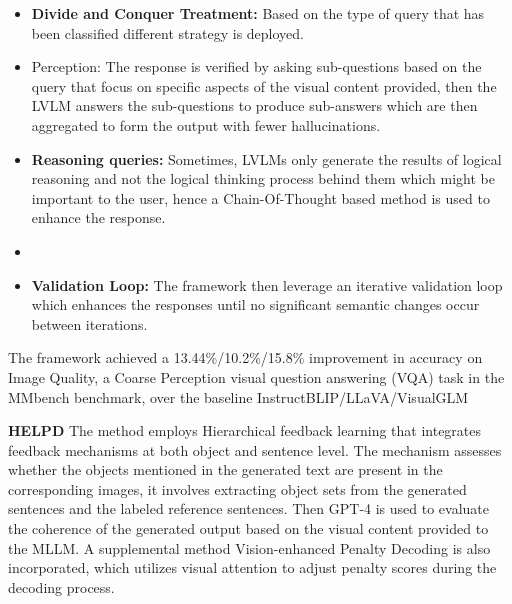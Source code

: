 \documentclass[twocolumn, 9pt]{extarticle}
\begin{document}
\begin{itemize}
    \item \textbf{Divide and Conquer Treatment:} Based on the type of query that has been classified different strategy is deployed.
    \item Perception: The response is verified by asking sub-questions based on the query that focus on specific aspects of the visual content provided, then the LVLM answers the sub-questions to produce sub-answers which are then aggregated to form the output with fewer hallucinations.
    \item \textbf{Reasoning queries:}  Sometimes, LVLMs only generate the results of logical reasoning and not the logical thinking process behind them which might be important to the user, hence a Chain-Of-Thought based method is used to enhance the response.
    \item 
    \item \textbf{Validation Loop:} The framework then leverage an iterative validation loop which enhances the responses until no significant semantic changes occur between iterations.
\end{itemize}

The framework achieved a 13.44\%/10.2\%/15.8\% improvement in accuracy on Image Quality, a Coarse Perception visual question answering (VQA) task in the MMbench benchmark, over the baseline InstructBLIP/LLaVA/VisualGLM

\textbf{HELPD} 
The method employs Hierarchical feedback learning that integrates feedback mechanisms at both object and sentence level. The mechanism assesses whether the objects mentioned in the generated text are present in the corresponding images, it involves extracting object sets from the generated sentences and the labeled reference sentences. Then GPT-4 is used to evaluate the coherence of the generated output based on the visual content provided to the MLLM. A supplemental method Vision-enhanced Penalty Decoding is also incorporated, which utilizes visual attention to adjust penalty scores during the decoding process. 
\end{document}
